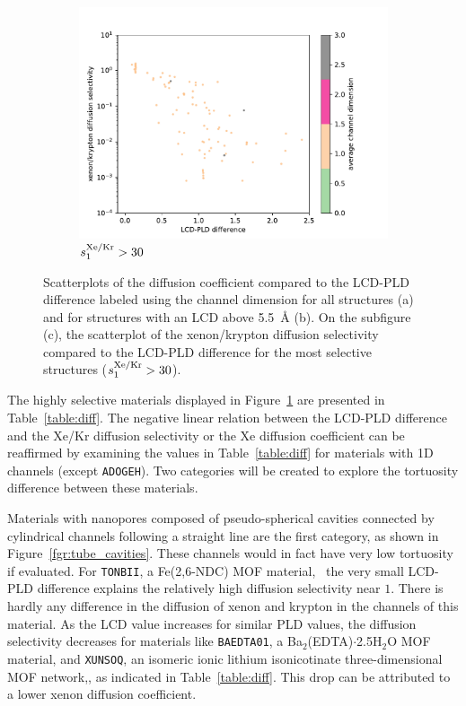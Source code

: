 \documentclass[main]{subfiles}
\begin{document}
\begin{figure}[ht]
\begin{subfigure}[b]{0.32\textwidth}
      \centering
      \includegraphics[width=\textwidth]{figures/5-diffusion/diff_D_xekr-poresize-chandim.pdf}
      \caption{$s^{\text{Xe/Kr}}_1>30$}\label{fgr:porediff_c}
  \end{subfigure}
     \caption{ Scatterplots of the diffusion coefficient compared to the LCD-PLD difference labeled using the channel dimension for all structures (a) and for structures with an LCD above \SI{5.5}{\angstrom} (b). On the subfigure (c), the scatterplot of the xenon/krypton diffusion selectivity compared to the LCD-PLD difference for the most selective structures ($s^{\text{Xe/Kr}}_1>30$). }\label{fgr:porediff}
\end{figure}

The highly selective materials displayed in Figure~\ref{fgr:porediff_c} are presented in Table~\ref{table:diff}. The negative linear relation between the LCD-PLD difference and the Xe/Kr diffusion selectivity or the Xe diffusion coefficient can be reaffirmed by examining the values in Table~\ref{table:diff} for materials with 1D channels (except \texttt{ADOGEH}). Two categories will be created to explore the tortuosity difference between these materials.

Materials with nanopores composed of pseudo-spherical cavities connected by cylindrical channels following a straight line are the first category, as shown in Figure~\ref{fgr:tube_cavities}. These channels would in fact have very low tortuosity if evaluated. For \texttt{TONBII}, a Fe(2,6-NDC) MOF material,~\cite{Du_2010} the very small LCD-PLD difference explains the relatively high diffusion selectivity near $1$. There is hardly any difference in the diffusion of xenon and krypton in the channels of this material. As the LCD value increases for similar PLD values, the diffusion selectivity decreases for materials like \texttt{BAEDTA01}, a Ba$_2$(EDTA)$\cdot$2.5H$_2$O MOF material, and \texttt{XUNSOQ}, an isomeric ionic lithium isonicotinate three-dimensional MOF network,\autocite{Abrahams_2014}, as indicated in Table~\ref{table:diff}. This drop can be attributed to a lower xenon diffusion coefficient.
\end{document}
